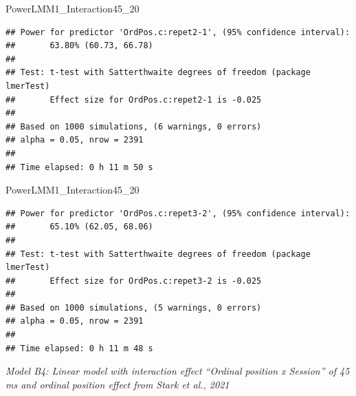 \documentclass[
]{article}
\newenvironment{Shaded}{\begin{snugshade}}{\end{snugshade}}
\newcommand{\AttributeTok}[1]{\textcolor[rgb]{0.77,0.63,0.00}{#1}}
\newcommand{\CommentTok}[1]{\textcolor[rgb]{0.56,0.35,0.01}{\textit{#1}}}
\newcommand{\FunctionTok}[1]{\textcolor[rgb]{0.00,0.00,0.00}{#1}}
\newcommand{\NormalTok}[1]{#1}
\newcommand{\OtherTok}[1]{\textcolor[rgb]{0.56,0.35,0.01}{#1}}
\newcommand{\SpecialCharTok}[1]{\textcolor[rgb]{0.00,0.00,0.00}{#1}}
\newcommand{\StringTok}[1]{\textcolor[rgb]{0.31,0.60,0.02}{#1}}
\begin{document}
\begin{Shaded}
\begin{Highlighting}[]
\NormalTok{PowerLMM1\_Interaction45\_20}
\end{Highlighting}
\end{Shaded}

\begin{verbatim}
## Power for predictor 'OrdPos.c:repet2-1', (95% confidence interval):
##       63.80% (60.73, 66.78)
## 
## Test: t-test with Satterthwaite degrees of freedom (package lmerTest)
##       Effect size for OrdPos.c:repet2-1 is -0.025
## 
## Based on 1000 simulations, (6 warnings, 0 errors)
## alpha = 0.05, nrow = 2391
## 
## Time elapsed: 0 h 11 m 50 s
\end{verbatim}

\begin{Shaded}
\end{Shaded}

\begin{Shaded}
\begin{Highlighting}[]
\NormalTok{PowerLMM1\_Interaction45\_20}
\end{Highlighting}
\end{Shaded}

\begin{verbatim}
## Power for predictor 'OrdPos.c:repet3-2', (95% confidence interval):
##       65.10% (62.05, 68.06)
## 
## Test: t-test with Satterthwaite degrees of freedom (package lmerTest)
##       Effect size for OrdPos.c:repet3-2 is -0.025
## 
## Based on 1000 simulations, (5 warnings, 0 errors)
## alpha = 0.05, nrow = 2391
## 
## Time elapsed: 0 h 11 m 48 s
\end{verbatim}

\emph{Model B4: Linear model with interaction effect ``Ordinal position
x Session'' of 45 ms and ordinal position effect from Stark et al.,
2021}

\begin{Shaded}
\end{Shaded}
\end{document}
